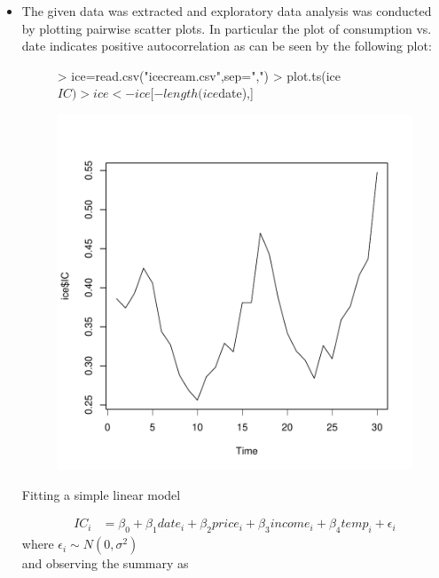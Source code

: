 \documentclass[12pt]{article}
\begin{document}
\begin{itemize}
\item The given data was extracted and exploratory data analysis was conducted by plotting pairwise scatter plots. In particular the plot of consumption vs. date indicates positive autocorrelation as can be seen by the following plot:
\begin{figure}[H]
\begin{Schunk}
\begin{Sinput}
> ice=read.csv("icecream.csv",sep=",")
> plot.ts(ice$IC)
> ice<-ice[-length(ice$date),]
\end{Sinput}
\end{Schunk}
\includegraphics{HW7-001}
\end{figure}

Fitting a simple linear model 

\begin{equation*}
\begin{aligned}
IC_{i} &= \beta_0 + \beta_1 date_{i} +  \beta_2 price_{i} + \beta_3 income_{i} + \beta_4 temp_{i} + \epsilon_{i}
\end{aligned}
\end{equation*}
where $\epsilon_{i} \sim N(0,\sigma^2)$\\

and observing the summary as 


\end{itemize}
\end{document}
